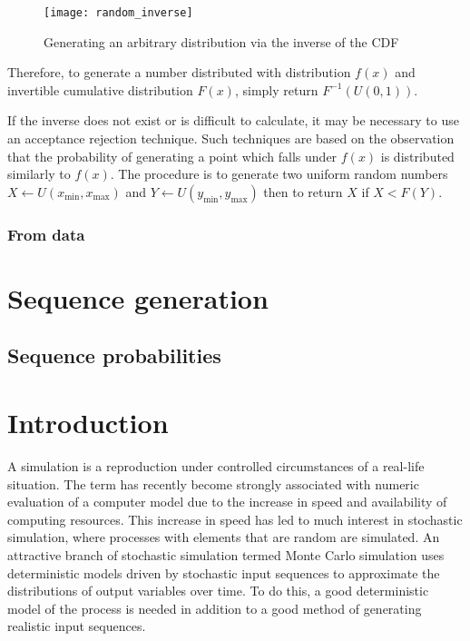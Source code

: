 \begin{figure}[htbp]
  \centering
  \texttt{[image: random\_inverse]}
  \caption[Generating an arbitrary distribution via the inverse of the CDF]{Generating an arbitrary distribution via the inverse of the CDF \citep{saucier2000computer}}
  \label{fig:random_inverse}
\end{figure}

Therefore, to generate a number distributed with distribution $f(x)$ and invertible cumulative distribution $F(x)$, simply return $F^{-1}(U(0, 1))$.

If the inverse does not exist or is difficult to calculate, it may be necessary to use an acceptance rejection technique.
Such techniques are based on the observation that the probability of generating a point which falls under $f(x)$ is distributed similarly to $f(x)$.
The procedure is to generate two uniform random numbers $X \leftarrow U(x_{\min}, x_{\max})$ and $Y \leftarrow U(y_{\min}, y_{\max})$ then to return $X$ if $X<F(Y)$.

\subsubsection{From data}


\section{Sequence generation}
\subsection{Sequence probabilities}

\section{Introduction}
A simulation is a reproduction under controlled circumstances of a real-life situation.
The term has recently become strongly associated with numeric evaluation of a computer model due to the increase in speed and availability of computing resources.
This increase in speed has led to much interest in stochastic simulation, where processes with elements that are random are simulated.
An attractive branch of stochastic simulation termed Monte Carlo simulation uses deterministic models driven by stochastic input sequences to approximate the distributions of output variables over time.
To do this, a good deterministic model of the process is needed in addition to a good method of generating realistic input sequences.

